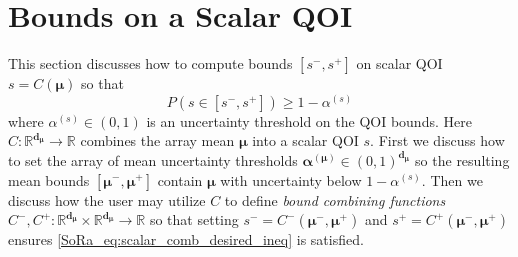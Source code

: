 \documentclass[graybox]{svmult}
\begin{document}

\section{Bounds on a Scalar QOI} \label{SoRa_sec:comb_sol_approx}

This section discusses how to compute bounds $[s^-,s^+]$ on scalar QOI $s = C(\boldsymbol{\mu})$ so that 
\begin{equation}
    P(s \in [s^-,s^+]) \geq 1-\alpha^{(s)}
    \label{SoRa_eq:scalar_comb_desired_ineq}
\end{equation}
where $\alpha^{(s)} \in (0,1)$ is an uncertainty threshold on the QOI bounds. Here $C: \mathbb{R}^{\boldsymbol{d}_{\boldsymbol{\mu}}} \to \mathbb{R}$ combines the array mean $\boldsymbol{\mu}$ into a scalar QOI $s$. First we discuss how to set the array of mean uncertainty thresholds $\boldsymbol{\alpha}^{(\boldsymbol{\mu})} \in (0,1)^{\boldsymbol{d}_{\boldsymbol{\mu}}}$ so the resulting mean bounds $[\boldsymbol{\mu}^-,\boldsymbol{\mu}^+]$ contain $\boldsymbol{\mu}$ with uncertainty below $1-\alpha^{(s)}$. Then we discuss how the user may utilize $C$ to define \emph{bound combining functions} $C^-,C^+: \mathbb{R}^{\boldsymbol{d}_{\boldsymbol{\mu}}} \times \mathbb{R}^{\boldsymbol{d}_{\boldsymbol{\mu}}} \to \mathbb{R}$ so that setting $s^- = C^-(\boldsymbol{\mu}^-,\boldsymbol{\mu}^+)$ and $s^+ = C^+(\boldsymbol{\mu}^-,\boldsymbol{\mu}^+)$ ensures \eqref{SoRa_eq:scalar_comb_desired_ineq} is satisfied.
\end{document}
